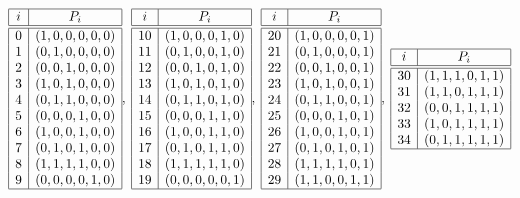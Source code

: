 {\renewcommand*{\arraystretch}{1.5}
$$
\begin{array}{|c|c|}
\hline
i & P_{i}\\
\hline
\hline
0 & ( 1, 0, 0, 0, 0, 0 )\\
1 & ( 0, 1, 0, 0, 0, 0 )\\
2 & ( 0, 0, 1, 0, 0, 0 )\\
3 & ( 1, 0, 1, 0, 0, 0 )\\
4 & ( 0, 1, 1, 0, 0, 0 )\\
5 & ( 0, 0, 0, 1, 0, 0 )\\
6 & ( 1, 0, 0, 1, 0, 0 )\\
7 & ( 0, 1, 0, 1, 0, 0 )\\
8 & ( 1, 1, 1, 1, 0, 0 )\\
9 & ( 0, 0, 0, 0, 1, 0 )\\
\hline
\end{array}
, \;
\begin{array}{|c|c|c|}
\hline
i & P_{i}\\
\hline
\hline
10 & ( 1, 0, 0, 0, 1, 0 )\\
11 & ( 0, 1, 0, 0, 1, 0 )\\
12 & ( 0, 0, 1, 0, 1, 0 )\\
13 & ( 1, 0, 1, 0, 1, 0 )\\
14 & ( 0, 1, 1, 0, 1, 0 )\\
15 & ( 0, 0, 0, 1, 1, 0 )\\
16 & ( 1, 0, 0, 1, 1, 0 )\\
17 & ( 0, 1, 0, 1, 1, 0 )\\
18 & ( 1, 1, 1, 1, 1, 0 )\\
19 & ( 0, 0, 0, 0, 0, 1 )\\
\hline
\end{array}
, \;
\begin{array}{|c|c|c|}
\hline
i & P_{i}\\
\hline
\hline
20 & ( 1, 0, 0, 0, 0, 1 )\\
21 & ( 0, 1, 0, 0, 0, 1 )\\
22 & ( 0, 0, 1, 0, 0, 1 )\\
23 & ( 1, 0, 1, 0, 0, 1 )\\
24 & ( 0, 1, 1, 0, 0, 1 )\\
25 & ( 0, 0, 0, 1, 0, 1 )\\
26 & ( 1, 0, 0, 1, 0, 1 )\\
27 & ( 0, 1, 0, 1, 0, 1 )\\
28 & ( 1, 1, 1, 1, 0, 1 )\\
29 & ( 1, 1, 0, 0, 1, 1 )\\
\hline
\end{array}
, \;
\begin{array}{|c|c|c|}
\hline
i & P_{i}\\
\hline
\hline
30 & ( 1, 1, 1, 0, 1, 1 )\\
31 & ( 1, 1, 0, 1, 1, 1 )\\
32 & ( 0, 0, 1, 1, 1, 1 )\\
33 & ( 1, 0, 1, 1, 1, 1 )\\
34 & ( 0, 1, 1, 1, 1, 1 )\\
\hline
\end{array}
$$}%
